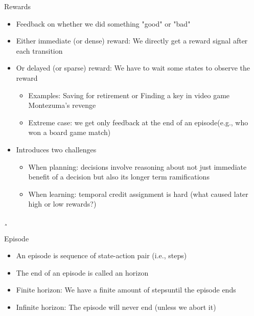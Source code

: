 \begin{frame}[c]{Rewards}
	\begin{itemize}
		\item Feedback on whether we did something "good" or "bad"
		\smallskip
		\pause
		\item Either immediate (or dense) reward: We directly get a reward signal after each transition
		\item Or delayed (or sparse) reward: We have to wait some states to observe the reward
		\begin{itemize}
			\item Examples: Saving for retirement or Finding a key in video game Montezuma’s revenge
			\item Extreme case: we get only feedback at the end of an episode\newline (e.g., who won a board game match)
		\end{itemize}
		\item Introduces two challenges
		\begin{itemize}
			\item When planning: decisions involve reasoning about not just immediate
			benefit of a decision but also its longer term ramifications
			\item When learning: temporal credit assignment is hard (what caused later
			high or low rewards?)
		\end{itemize}
	\end{itemize}¸
\end{frame}
\begin{frame}[c]{Episode}
	\begin{itemize}
		\item An episode is sequence of state-action pair (i.e., steps)
		\item The end of an episode is called an horizon
		\smallskip
		\pause
		\item Finite horizon: We have a finite amount of steps\newline until the episode ends
		\item Infinite horizon: The episode will never end (unless we abort it)
	\end{itemize}
\end{frame}

